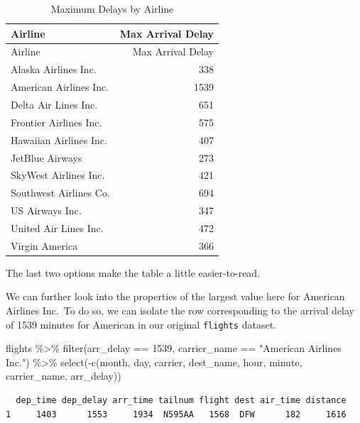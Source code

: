 \documentclass[
  letterpaper,
  12pt,
  twoside]{book}
\newenvironment{Shaded}{\begin{snugshade}}{\end{snugshade}}
\newcommand{\DecValTok}[1]{\textcolor[rgb]{0.68,0.00,0.00}{#1}}
\newcommand{\FunctionTok}[1]{\textcolor[rgb]{0.28,0.35,0.67}{#1}}
\newcommand{\NormalTok}[1]{\textcolor[rgb]{0.00,0.23,0.31}{#1}}
\newcommand{\SpecialCharTok}[1]{\textcolor[rgb]{0.37,0.37,0.37}{#1}}
\newcommand{\StringTok}[1]{\textcolor[rgb]{0.13,0.47,0.30}{#1}}
\begin{document}
\begin{longtable}[]{@{}lr@{}}
\caption{Maximum Delays by Airline}\tabularnewline
\toprule\noalign{}
Airline & Max Arrival Delay \\
\midrule\noalign{}
\endfirsthead
\toprule\noalign{}
Airline & Max Arrival Delay \\
\midrule\noalign{}
\endhead
\bottomrule\noalign{}
\endlastfoot
Alaska Airlines Inc. & 338 \\
American Airlines Inc. & 1539 \\
Delta Air Lines Inc. & 651 \\
Frontier Airlines Inc. & 575 \\
Hawaiian Airlines Inc. & 407 \\
JetBlue Airways & 273 \\
SkyWest Airlines Inc. & 421 \\
Southwest Airlines Co. & 694 \\
US Airways Inc. & 347 \\
United Air Lines Inc. & 472 \\
Virgin America & 366 \\
\end{longtable}

The last two options make the table a little easier-to-read.

We can further look into the properties of the largest value here for
American Airlines Inc.~To do so, we can isolate the row corresponding to
the arrival delay of 1539 minutes for American in our original
\texttt{flights} dataset.

\begin{Shaded}
\begin{Highlighting}[]
\NormalTok{flights }\SpecialCharTok{\%\textgreater{}\%}
  \FunctionTok{filter}\NormalTok{(arr\_delay }\SpecialCharTok{==} \DecValTok{1539}\NormalTok{,}
\NormalTok{         carrier\_name }\SpecialCharTok{==} \StringTok{"American Airlines Inc."}\NormalTok{) }\SpecialCharTok{\%\textgreater{}\%}
  \FunctionTok{select}\NormalTok{(}\SpecialCharTok{{-}}\FunctionTok{c}\NormalTok{(month, day, carrier, dest\_name, hour,}
\NormalTok{            minute, carrier\_name, arr\_delay))}
\end{Highlighting}
\end{Shaded}

\begin{verbatim}
  dep_time dep_delay arr_time tailnum flight dest air_time distance
1     1403      1553     1934  N595AA   1568  DFW      182     1616
\end{verbatim}
\end{document}
